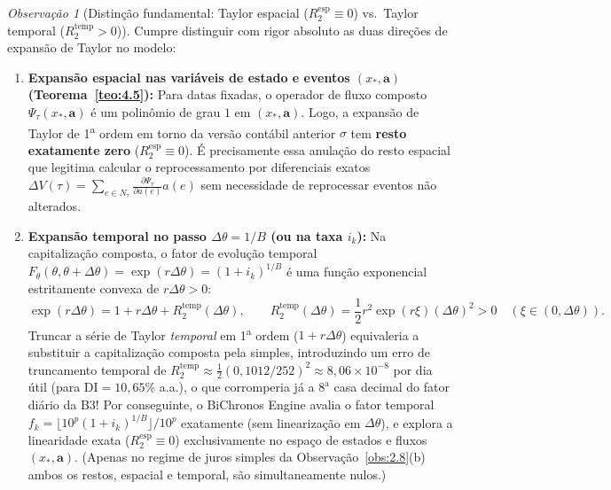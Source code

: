 \documentclass[11pt, a4paper]{article}
\theoremstyle{definition}
\theoremstyle{plain}
\theoremstyle{remark}
\newtheorem{observacao}[definicao]{Observação}
\begin{document}
\begin{observacao}[Distinção fundamental: Taylor espacial ($R_2^{\text{esp}} \equiv 0$) vs.\ Taylor temporal ($R_2^{\text{temp}} > 0$)]\label{obs:4.6}
Cumpre distinguir com rigor absoluto as duas direções de expansão de Taylor no modelo:
\begin{enumerate}[label=(\alph*)]
    \item \textbf{Expansão espacial nas variáveis de estado e eventos $(x_*, \mathbf{a})$ (Teorema~\ref{teo:4.5}):} Para datas fixadas, o operador de fluxo composto $\Psi_\tau(x_*, \mathbf{a})$ é um polinômio de grau $1$ em $(x_*, \mathbf{a})$. Logo, a expansão de Taylor de 1\textsuperscript{a} ordem em torno da versão contábil anterior $\sigma$ tem \textbf{resto exatamente zero} ($R_2^{\text{esp}} \equiv 0$). É precisamente essa anulação do resto espacial que legitima calcular o reprocessamento por diferenciais exatos $\Delta V(\tau) = \sum_{e \in N_\tau} \frac{\partial \Psi_\tau}{\partial a(e)} a(e)$ sem necessidade de reprocessar eventos não alterados.
    \item \textbf{Expansão temporal no passo $\Delta\theta = 1/B$ (ou na taxa $i_k$):} Na capitalização composta, o fator de evolução temporal $F_\theta(\theta, \theta + \Delta\theta) = \exp(r\Delta\theta) = (1 + i_k)^{1/B}$ é uma função exponencial estritamente convexa de $r\Delta\theta > 0$:
    \[
    \exp(r\Delta\theta) = 1 + r\Delta\theta + R_2^{\text{temp}}(\Delta\theta), \qquad R_2^{\text{temp}}(\Delta\theta) = \frac{1}{2}r^2 \exp(r\xi)(\Delta\theta)^2 > 0 \quad (\xi \in (0, \Delta\theta)).
    \]
    Truncar a série de Taylor \emph{temporal} em 1\textsuperscript{a} ordem ($1 + r\Delta\theta$) equivaleria a substituir a capitalização composta pela simples, introduzindo um erro de truncamento temporal de $R_2^{\text{temp}} \approx \frac{1}{2}(0{,}1012 / 252)^2 \approx 8{,}06 \times 10^{-8}$ por dia útil (para $\text{DI} = 10{,}65\%$ a.a.), o que corromperia já a $8^{\text{a}}$ casa decimal do fator diário da B3! Por conseguinte, o BiChronos Engine avalia o fator temporal $f_k = \lfloor 10^p(1+i_k)^{1/B}\rfloor/10^p$ exatamente (sem linearização em $\Delta\theta$), e explora a linearidade exata ($R_2^{\text{esp}} \equiv 0$) exclusivamente no espaço de estados e fluxos $(x_*, \mathbf{a})$. (Apenas no regime de juros simples da Observação~\ref{obs:2.8}(b) ambos os restos, espacial e temporal, são simultaneamente nulos.)
\end{enumerate}
\end{observacao}
\end{document}
